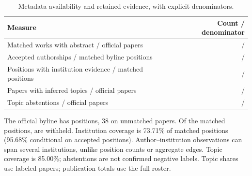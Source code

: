 \begin{table}[!htbp]\centering\small
\caption{Metadata availability and retained evidence, with explicit denominators.}\label{tab:coverage}
\begin{tabularx}{\textwidth}{Yr}\toprule
Measure & Count / denominator\\\midrule
Matched works with abstract / official papers & \MatchedWorks{} / \Papers{}\\
Accepted authorships / matched byline positions & \AcceptedAuthorships{} / \MatchedPositions{}\\
Positions with institution evidence / matched positions & \AffiliatedPositions{} / \MatchedPositions{}\\
Papers with inferred topics / official papers & \LabeledPapers{} / \Papers{}\\
Topic abstentions / official papers & \AbstainedPapers{} / \Papers{}\\\bottomrule
\end{tabularx}\end{table}

The official byline has \OfficialPositions{} positions, 38 on unmatched papers.
Of the \MatchedPositions{} matched positions, \WithheldAuthorships{} are withheld.
Institution coverage is 73.71\% of matched positions (95.68\% conditional on
accepted positions). Author--institution observations can span several
institutions, unlike position counts or aggregate edges. Topic coverage is
85.00\%; abstentions are not confirmed negative labels. Topic shares use
labeled papers; publication totals use the full roster.
